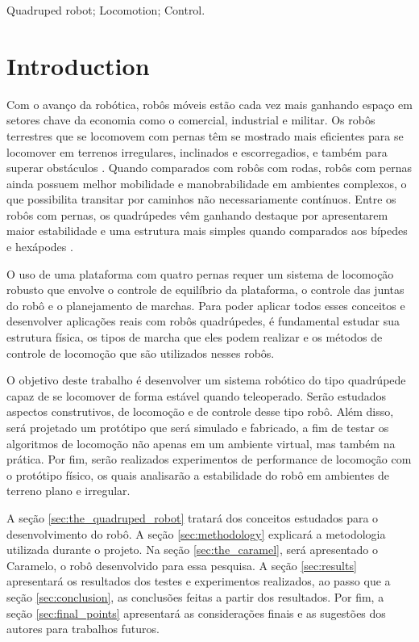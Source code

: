 \documentclass[conference]{IEEEtran}
\begin{document}
\begin{IEEEkeywords}
Quadruped robot; Locomotion; Control.
\end{IEEEkeywords}

\section{Introduction}
Com o avanço da robótica, robôs móveis estão cada vez mais ganhando espaço em setores chave da economia como o comercial, industrial e militar. Os robôs terrestres que se locomovem com pernas têm se mostrado mais eficientes para se locomover em terrenos irregulares, inclinados e escorregadios, e também para superar obstáculos \cite{X.134}. Quando comparados com robôs com rodas, robôs com pernas ainda possuem melhor mobilidade e manobrabilidade em ambientes complexos, o que possibilita transitar por caminhos não necessariamente contínuos. Entre os robôs com pernas, os quadrúpedes vêm ganhando destaque por apresentarem maior estabilidade e uma estrutura mais simples quando comparados aos bípedes e hexápodes \cite{Shi2021}.

O uso de uma plataforma com quatro pernas requer um sistema de locomoção robusto que envolve o controle de equilíbrio da plataforma, o controle das juntas do robô e o planejamento de marchas. Para poder aplicar todos esses conceitos e desenvolver aplicações reais com robôs quadrúpedes, é fundamental estudar sua estrutura física, os tipos de marcha que eles podem realizar e os métodos de controle de locomoção que são utilizados nesses robôs.

O objetivo deste trabalho é desenvolver um sistema robótico do tipo quadrúpede capaz de se locomover de forma estável quando teleoperado. Serão estudados aspectos construtivos, de locomoção e de controle desse tipo robô. Além disso, será projetado um protótipo que será simulado e fabricado, a fim de testar os algoritmos de locomoção não apenas em um ambiente virtual, mas também na prática. Por fim, serão realizados experimentos de performance de locomoção com o protótipo físico, os quais analisarão a estabilidade do robô em ambientes de terreno plano e irregular.

A seção \ref{sec:the_quadruped_robot} tratará dos conceitos estudados para o desenvolvimento do robô. A seção \ref{sec:methodology} explicará a metodologia utilizada durante o projeto. Na seção \ref{sec:the_caramel}, será apresentado o Caramelo, o robô desenvolvido para essa pesquisa. A seção \ref{sec:results} apresentará os resultados dos testes e experimentos realizados, ao passo que a seção \ref{sec:conclusion}, as conclusões feitas a partir dos resultados. Por fim, a seção \ref{sec:final_points} apresentará as considerações finais e as sugestões dos autores para trabalhos futuros.
\end{document}
